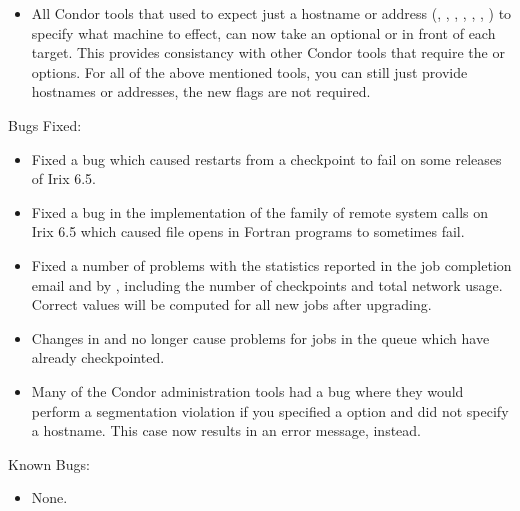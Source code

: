 \begin{itemize}
\item All Condor tools that used to expect just a hostname or address 
(, , , ,
, , ) to specify
what machine to effect, can now take an optional  or
 in front of each target.
This provides consistancy with other Condor tools that require the
 or  options.
For all of the above mentioned tools, you can still just provide
hostnames or addresses, the new flags are not required.

\end{itemize}

\noindent Bugs Fixed:

\begin{itemize}

\item Fixed a bug which caused restarts from a checkpoint to fail on
some releases of Irix 6.5.

\item Fixed a bug in the implementation of the  family
of remote system calls on Irix 6.5 which caused file opens in Fortran
programs to sometimes fail.

\item Fixed a number of problems with the statistics reported in the
job completion email and by  , including the
number of checkpoints and total network usage.  Correct values will be
computed for all new jobs after upgrading.

\item Changes in  and
 no longer cause problems for jobs in the
queue which have already checkpointed.

\item Many of the Condor administration tools had a bug where they
would perform a segmentation violation if you specified a  
option and did not specify a hostname.
This case now results in an error message, instead.

\end{itemize}

\noindent Known Bugs:

\begin{itemize}

\item None.

\end{itemize}

